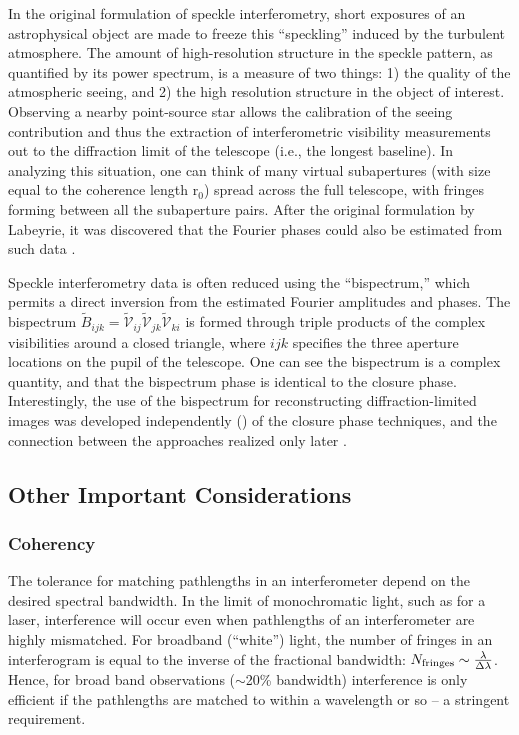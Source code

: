 \documentclass[12pt]{article}
\begin{document}
In the original formulation of speckle interferometry, short exposures
of an astrophysical object are made to freeze this ``speckling''
induced by the turbulent atmosphere.  The amount of high-resolution
structure in the speckle pattern, as quantified by its power spectrum,
is a measure of two things: 1) the quality of the atmospheric seeing,
and 2) the high resolution structure in the object of interest.
Observing a nearby point-source star allows the calibration of the
seeing contribution and thus the extraction of interferometric
visibility measurements out to the diffraction limit of the telescope
(i.e., the longest baseline).  In analyzing this situation, one can
think of many virtual subapertures (with size equal to the coherence
length r$_0$) spread across the full telescope, with fringes forming
between all the subaperture pairs.  After the original formulation by
Labeyrie, it was discovered that the Fourier phases could also
be estimated from such data \citep[e.g.,][]{kt74,weigelt77}.

Speckle interferometry data is often reduced using the ``bispectrum,''
which permits a direct inversion from the estimated Fourier amplitudes
and phases.  The bispectrum $\tilde{B}_{ijk}= \tilde{\mathcal V}_{ij}
\tilde{\mathcal V}_{jk}\tilde{\mathcal V}_{ki}$ is formed through
triple products of the complex visibilities around a closed triangle,
where $ijk$ specifies the three aperture locations on the pupil of the
telescope.  One can see the bispectrum is a complex quantity, and that
the bispectrum phase is identical to the closure phase.
Interestingly, the use of the bispectrum for reconstructing
diffraction-limited images was developed independently
(\citealt{weigelt77,hw93}) of the closure phase techniques, and the
connection between the approaches realized only later
\citep{roddier86,cornwell1987}.


\subsection{Other Important Considerations}

\subsubsection{Coherency}
The tolerance for matching pathlengths in an interferometer
depend on the desired spectral bandwidth.  In the limit of monochromatic
light, such as for a laser, interference will occur even when pathlengths of
an interferometer are highly mismatched.  For broadband (``white'') light,
the number of fringes in an interferogram is equal to the inverse of
the fractional bandwidth: $N_{\rm fringes} \sim \frac{\lambda}{\Delta \lambda}$.
Hence, for broad band observations ($\sim$20\% bandwidth) interference is only
efficient if the pathlengths are matched to within a wavelength or so -- 
a stringent requirement.
\end{document}
